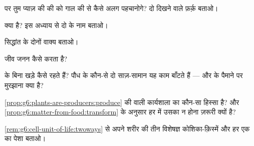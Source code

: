 \begin{exercise}[$\star$]\label{exo:g6:cell-unit-of-life:3}
 पर तुम प्याज़ की  की  को गाल की  से कैसे
अलग पहचानोगे? दो दिखने वाले फ़र्क़ बताओ।
\end{exercise}

\begin{exercise}[$\star$]\label{exo:g6:cell-unit-of-life:4}
  क्या है? इस अध्याय से दो के नाम बताओ।
\end{exercise}

\begin{exercise}[$\star$]\label{exo:g6:cell-unit-of-life:5}
 सिद्धांत के दोनों वाक्य बताओ।
\end{exercise}

\begin{exercise}[$\star$]\label{exo:g6:cell-unit-of-life:6}
 जीव जनन कैसे करता है?
\end{exercise}

\begin{exercise}[$\star\star$]\label{exo:g6:cell-unit-of-life:7}
  के बिना खड़े कैसे रहते हैं? पौध  के कौन-से दो
साज़-सामान यह काम बाँटते हैं --- और  के पैमाने पर मुरझाना क्या
है?
\end{exercise}

\begin{exercise}[$\star\star$]\label{exo:g6:cell-unit-of-life:8}
\cref{prop:g6:plants-are-producers:produce} की  वाली कार्यशाला
 का कौन-सा हिस्सा है? और
\cref{prop:g6:matter-from-food:transform} के अनुसार हर   में
उसका न होना ज़रूरी क्यों है?
\end{exercise}

\begin{exercise}[$\star\star$]\label{exo:g6:cell-unit-of-life:9}
\cref{rem:g6:cell-unit-of-life:twoways} से अपने शरीर की तीन विशेषज्ञ
कोशिका-क़िस्में और हर एक का पेशा बताओ।
\end{exercise}

